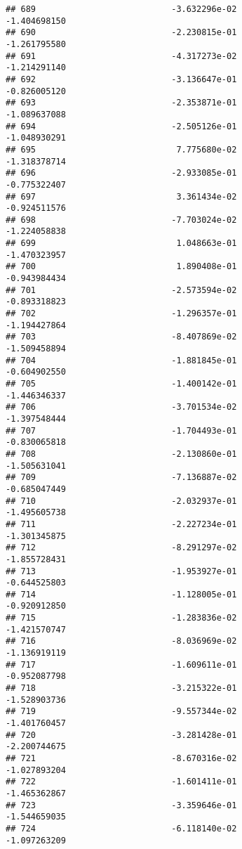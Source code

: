 \documentclass[
]{article}
\begin{document}
\begin{verbatim}
## 689                           -3.632296e-02               -1.404698150
## 690                           -2.230815e-01               -1.261795580
## 691                           -4.317273e-02               -1.214291140
## 692                           -3.136647e-01               -0.826005120
## 693                           -2.353871e-01               -1.089637088
## 694                           -2.505126e-01               -1.048930291
## 695                            7.775680e-02               -1.318378714
## 696                           -2.933085e-01               -0.775322407
## 697                            3.361434e-02               -0.924511576
## 698                           -7.703024e-02               -1.224058838
## 699                            1.048663e-01               -1.470323957
## 700                            1.890408e-01               -0.943984434
## 701                           -2.573594e-02               -0.893318823
## 702                           -1.296357e-01               -1.194427864
## 703                           -8.407869e-02               -1.509458894
## 704                           -1.881845e-01               -0.604902550
## 705                           -1.400142e-01               -1.446346337
## 706                           -3.701534e-02               -1.397548444
## 707                           -1.704493e-01               -0.830065818
## 708                           -2.130860e-01               -1.505631041
## 709                           -7.136887e-02               -0.685047449
## 710                           -2.032937e-01               -1.495605738
## 711                           -2.227234e-01               -1.301345875
## 712                           -8.291297e-02               -1.855728431
## 713                           -1.953927e-01               -0.644525803
## 714                           -1.128005e-01               -0.920912850
## 715                           -1.283836e-02               -1.421570747
## 716                           -8.036969e-02               -1.136919119
## 717                           -1.609611e-01               -0.952087798
## 718                           -3.215322e-01               -1.528903736
## 719                           -9.557344e-02               -1.401760457
## 720                           -3.281428e-01               -2.200744675
## 721                           -8.670316e-02               -1.027893204
## 722                           -1.601411e-01               -1.465362867
## 723                           -3.359646e-01               -1.544659035
## 724                           -6.118140e-02               -1.097263209

\end{verbatim}
\end{document}
